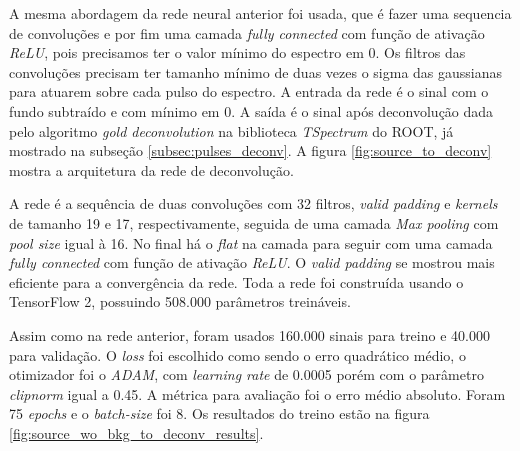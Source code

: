 \documentclass[a4paper,12pt,oneside]{book}
\begin{document}


\par A mesma abordagem da rede neural anterior foi usada, que é fazer uma sequencia de convoluções e por fim uma camada \textit{fully connected} com função de ativação \textit{ReLU}, pois precisamos ter o valor mínimo do espectro em 0. Os filtros das convoluções precisam ter tamanho mínimo de duas vezes o sigma das gaussianas para atuarem sobre cada pulso do espectro. A entrada da rede é o sinal com o fundo subtraído e com mínimo em 0. A saída é o sinal após deconvolução dada pelo algoritmo \textit{gold deconvolution} na biblioteca \textit{TSpectrum} do ROOT, já mostrado na subseção \ref{subsec:pulses_deconv}. A figura \ref{fig:source_to_deconv} mostra a arquitetura da rede de deconvolução.

\par A rede é a sequência de duas convoluções com 32 filtros, \textit{valid padding} e \textit{kernels} de tamanho 19 e 17, respectivamente, seguida de uma camada \textit{Max pooling} com \textit{pool size} igual à 16. No final há o \textit{flat} na camada para seguir com uma camada \textit{fully connected} com função de ativação \textit{ReLU}. O \textit{valid padding} se mostrou mais eficiente para a convergência da rede. Toda a rede foi construída usando o TensorFlow 2, possuindo 508.000 parâmetros treináveis\cite{FORTINO2022166497}.

\par Assim como na rede anterior, foram usados 160.000 sinais para treino e 40.000 para validação. O \textit{loss} foi escolhido como sendo o erro quadrático médio, o otimizador foi o \textit{ADAM}, com \textit{learning rate} de 0.0005 porém com o parâmetro \textit{clipnorm} igual a 0.45. A métrica para avaliação foi o erro médio absoluto. Foram 75 \textit{epochs} e o \textit{batch-size} foi 8. Os resultados do treino estão na figura \ref{fig:source_wo_bkg_to_deconv_results}.
\end{document}
